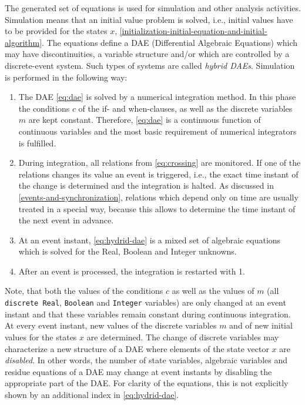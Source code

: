 The generated set of equations is used for simulation and other analysis
activities. Simulation means that an initial value problem is solved,
i.e., initial values have to be provided for the states $x$, \cref{initialization-initial-equation-and-initial-algorithm}.
The equations define a DAE (Differential Algebraic Equations) which may
have discontinuities, a variable structure and/or which are controlled
by a discrete-event system. Such types of systems are called
\emph{hybrid DAEs}. Simulation is performed in the following way:
\begin{enumerate}
\item
  The DAE \eqref{eq:dae} is solved by a numerical integration method. In this
  phase the conditions $c$ of the if- and when-clauses, as well as the
  discrete variables $m$ are kept constant. Therefore, \eqref{eq:dae} is a
  continuous function of continuous variables and the most basic
  requirement of numerical integrators is fulfilled.
\item
  During integration, all relations from \eqref{eq:crossing} are monitored. If one of
  the relations changes its value an event is triggered, i.e., the exact
  time instant of the change is determined and the integration is
  halted. As discussed in \cref{events-and-synchronization}, relations which depend only on
  time are usually treated in a special way, because this allows to
  determine the time instant of the next event in advance.
\item
  At an event instant, \eqref{eq:hydrid-dae} is a mixed set of algebraic equations which
  is solved for the Real, Boolean and Integer unknowns.
\item
  After an event is processed, the integration is restarted with 1.
\end{enumerate}

Note, that both the values of the conditions $c$ as well as the values of
$m$ (all \lstinline!discrete Real!, \lstinline!Boolean! and \lstinline!Integer! variables) are only changed at
an event instant and that these variables remain constant during
continuous integration. At every event instant, new values of the
discrete variables $m$ and of new initial values for the states $x$ are
determined. The change of discrete variables may characterize a new
structure of a DAE where elements of the state vector $x$ are
\emph{disabled}. In other words, the number of state variables,
algebraic variables and residue equations of a DAE may change at event
instants by disabling the appropriate part of the DAE. For clarity of
the equations, this is not explicitly shown by an additional index in
\eqref{eq:hydrid-dae}.


